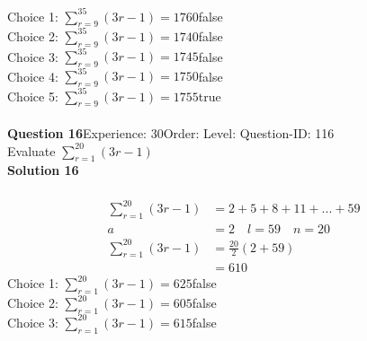 \documentclass{article}
\begin{document}
Choice 1: \hspace{20pt}$\displaystyle\sum_{r=9}^{35} (3r-1)=1760$\hspace{20pt}false\\
Choice 2: \hspace{20pt}$\displaystyle\sum_{r=9}^{35} (3r-1)=1740$\hspace{20pt}false\\
Choice 3: \hspace{20pt}$\displaystyle\sum_{r=9}^{35} (3r-1)=1745$\hspace{20pt}false\\
Choice 4: \hspace{20pt}$\displaystyle\sum_{r=9}^{35} (3r-1)=1750$\hspace{20pt}false\\
Choice 5: \hspace{20pt}$\displaystyle\sum_{r=9}^{35} (3r-1)=1755$\hspace{20pt}true\\
\\[4pt]
\noindent\textbf{Question 16}\hspace{20pt}Experience: 30\hspace{20pt}Order: \hspace{20pt}Level: \hspace{20pt}Question-ID: 116\\[2pt]
Evaluate $\displaystyle\sum_{r=1}^{20} (3r-1)$\\[4pt]
\noindent\textbf{Solution 16}\\[2pt]
\\[-35pt]\begin{align*}
\displaystyle\sum_{r=1}^{20} (3r-1)&=2+5+8+11+...+59\\[2pt]
a&=2\quad l=59 \quad n=20\\[2pt]
\displaystyle\sum_{r=1}^{20} (3r-1)&=\displaystyle\frac{20}{2}(2+59)\\[2pt]
&=610
\end{align*}
Choice 1: \hspace{20pt}$\displaystyle\sum_{r=1}^{20} (3r-1)=625$\hspace{20pt}false\\
Choice 2: \hspace{20pt}$\displaystyle\sum_{r=1}^{20} (3r-1)=605$\hspace{20pt}false\\
Choice 3: \hspace{20pt}$\displaystyle\sum_{r=1}^{20} (3r-1)=615$\hspace{20pt}false\\
\end{document}
